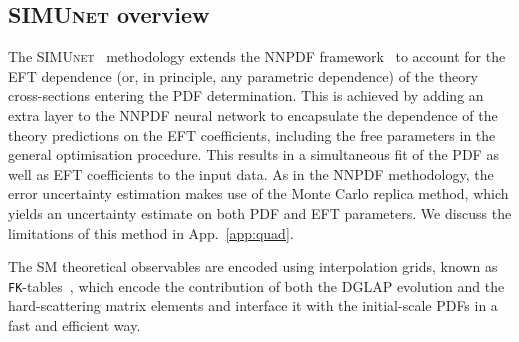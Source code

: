 \documentclass[withindex,glossary]{cam-thesis}
\newcommand{\simunet}{\textsc{SIMUnet}}
\begin{document}
\subsection{\simunet{} overview}
\label{sec:simunet}

The  \simunet{}~\cite{Iranipour:2022iak}
methodology extends the  NNPDF framework~\cite{NNPDF:2021njg, NNPDF:2021uiq} to
account for the EFT dependence (or, in principle, any parametric dependence) 
of the theory cross-sections entering the
PDF determination.
%
This is achieved by adding an extra layer to the NNPDF neural network to
encapsulate the dependence of the theory predictions on the EFT coefficients,
including the free parameters in the general optimisation procedure. This
results in a simultaneous fit of the PDF as well as EFT coefficients to the
input data.
%
As in the NNPDF methodology, the error uncertainty estimation makes use of the Monte
Carlo replica method, which yields an uncertainty estimate on both PDF and EFT
parameters.  We discuss the limitations of this method in App.~\ref{app:quad}.

The SM theoretical observables are encoded using interpolation grids,
known as {\tt FK}-tables~\cite{Ball:2010de,Ball:2012cx,Bertone:2016lga}, which 
encode the contribution of both the DGLAP evolution
and the hard-scattering matrix elements and interface it with the
initial-scale PDFs in a fast and efficient way. 
%
\end{document}
